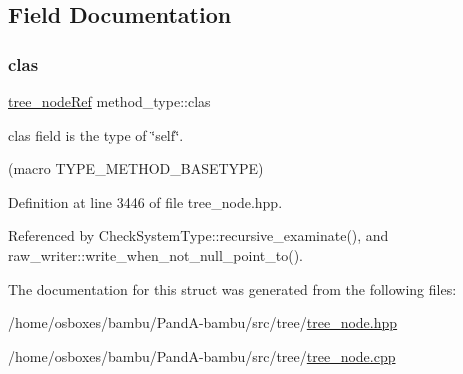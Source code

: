 \subsection{Field Documentation}
\mbox{\label{structmethod__type_a16b6784e001004d31e31495445c93b86}} 
\subsubsection{\texorpdfstring{clas}{clas}}
{\footnotesize\ttfamily \hyperlink{tree__node_8hpp_a6ee377554d1c4871ad66a337eaa67fd5}{tree\+\_\+node\+Ref} method\+\_\+type\+::clas}



clas field is the type of \char`\"{}self\char`\"{}. 

(macro T\+Y\+P\+E\+\_\+\+M\+E\+T\+H\+O\+D\+\_\+\+B\+A\+S\+E\+T\+Y\+PE) 

Definition at line 3446 of file tree\+\_\+node.\+hpp.



Referenced by Check\+System\+Type\+::recursive\+\_\+examinate(), and raw\+\_\+writer\+::write\+\_\+when\+\_\+not\+\_\+null\+\_\+point\+\_\+to().



The documentation for this struct was generated from the following files\+:\begin{DoxyCompactItemize}
\item 
/home/osboxes/bambu/\+Pand\+A-\/bambu/src/tree/\hyperlink{tree__node_8hpp}{tree\+\_\+node.\+hpp}\item 
/home/osboxes/bambu/\+Pand\+A-\/bambu/src/tree/\hyperlink{tree__node_8cpp}{tree\+\_\+node.\+cpp}\end{DoxyCompactItemize}
